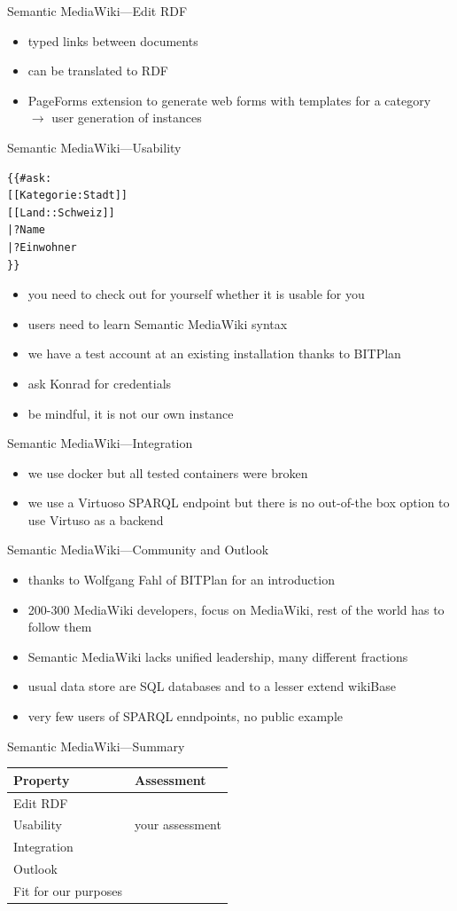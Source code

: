 \documentclass[aspectratio=1610]{beamer}
\newcommand{\xmark}{\ding{55}}%
\begin{document}
\begin{frame}{Semantic MediaWiki---Edit RDF}
\begin{itemize}
\item typed links between documents
\item can be translated to RDF
\item PageForms extension to generate web forms with templates for a category $\rightarrow$ user generation of instances
\end{itemize}
\end{frame}

\begin{frame}[fragile]{Semantic MediaWiki---Usability}
\begin{verbatim}
{{#ask:
[[Kategorie:Stadt]]
[[Land::Schweiz]]
|?Name
|?Einwohner
}}
\end{verbatim}
\begin{itemize}
\item you need to check out for yourself whether it is usable for you
\item users need to learn Semantic MediaWiki syntax
\item we have a test account at an existing installation thanks to BITPlan
\item ask Konrad for credentials
\item be mindful, it is not our own instance
\end{itemize}
\end{frame}

\begin{frame}{Semantic MediaWiki---Integration}
\begin{itemize}
\item we use docker but all tested containers were broken
\item we use a Virtuoso SPARQL endpoint but there is no out-of-the box option to use Virtuso as a backend
\end{itemize}
\end{frame}

\begin{frame}{Semantic MediaWiki---Community and Outlook}
\begin{itemize}
\item thanks to Wolfgang Fahl of BITPlan for an introduction
\item 200-300 MediaWiki developers, focus on MediaWiki, rest of the world has to follow them
\item Semantic MediaWiki lacks unified leadership, many different fractions
\item usual data store are SQL databases and to a lesser extend wikiBase
\item very few users of SPARQL enndpoints, no public example 
\end{itemize}
\end{frame}

\begin{frame}{Semantic MediaWiki---Summary}
\centering
\begin{tabulary}{\textwidth}{lL}
\toprule
Property		&Assessment\\
\midrule
Edit RDF		&~\\
Usability		&your assessment\\
Integration		&\xmark\\
Outlook			&\xmark\\
\midrule
Fit for our purposes	&\xmark\\
\bottomrule
\end{tabulary}
\end{frame}
\end{document}
